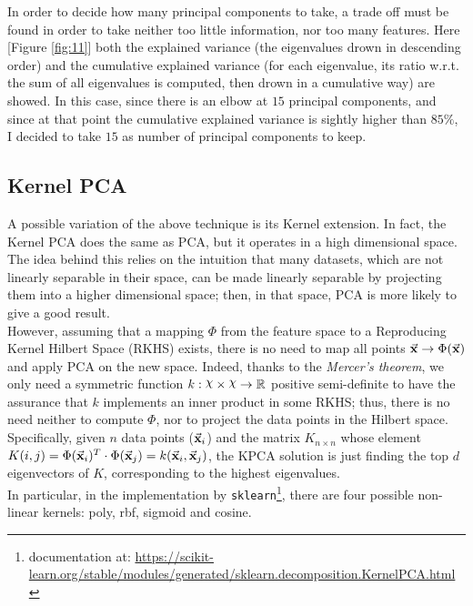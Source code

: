 \documentclass[letterpaper]{article}
\begin{document}
	\par In order to decide how many principal components to take, a trade off must be found in order to take neither too little information, nor too many features. 
	Here [Figure \ref{fig:11}] both the explained variance (the eigenvalues drown in descending order) and the cumulative explained variance (for each eigenvalue, its ratio w.r.t. the sum of all eigenvalues is computed, then drown in a cumulative way) are showed. In this case, since there is an elbow at $15$ principal components, and since at that point the cumulative explained variance is sightly higher than $85\%$, I decided to take $15$ as number of principal components to keep.

	\subsection{Kernel PCA} 	
	A possible variation of the above technique is its Kernel extension. In fact, the Kernel PCA does the same as PCA, but it operates in a high dimensional space. The idea behind this relies on the intuition that many datasets, which are not linearly separable in their space, can be made linearly separable by projecting them into a higher dimensional space; then, in that space, PCA is more likely to give a good result.\\ However, assuming that a mapping $\Phi$ from the feature space to a Reproducing Kernel Hilbert Space (RKHS) exists, there is no need to map all points $\va{x} \rightarrow \Phi(\va{x})$ and apply PCA on the new space. Indeed, thanks to the \emph{Mercer's theorem}, we only need a symmetric function $k: \raisebox{2pt}{$\chi$} \times \raisebox{2pt}{$\chi$} \rightarrow \mathbb{R}$ positive semi-definite to have the assurance that $k$ implements an inner product in some RKHS; thus, there is no need neither to compute $\Phi$, nor to project the data points in the Hilbert space. Specifically, given $n$ data points ($\va{x}_i$) and the matrix $K_{n\times n}$ whose element $K(i,j)=\Phi(\va{x}_i)^T\cdot\Phi(\va{x}_j)=k(\va{x}_i,\va{x}_j)$, the KPCA solution is just finding the top $d$ eigenvectors of $K$, corresponding to the highest eigenvalues. \\
	In particular, in the implementation by \texttt{sklearn}\footnote{documentation at: \url{https://scikit-learn.org/stable/modules/generated/sklearn.decomposition.KernelPCA.html}}, there are four possible non-linear kernels: poly, rbf, sigmoid and cosine.
\end{document}
